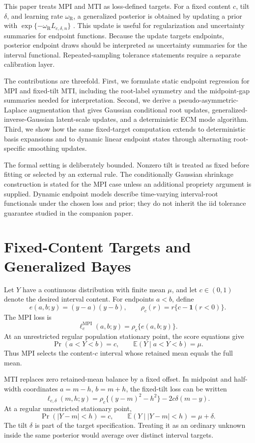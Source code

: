 \documentclass[11pt]{article}
\numberwithin{equation}{section}
\newcommand{\E}{\mathbb{E}}
\newcommand{\ind}{\mathbf{1}}
\begin{document}
This paper treats MPI and MTI as loss-defined targets. For a fixed content
\(c\), tilt \(\delta\), and learning rate \(\omega_{\mathrm R}\), a
generalized posterior is obtained by updating a prior with
\(\exp\{-\omega_{\mathrm R}L_{c,\delta,n}\}\)
\citep{BissiriHolmesWalker2016GeneralBayes}. This update is useful for
regularization and uncertainty summaries for endpoint functions. Because the
update targets endpoints, posterior endpoint draws should be interpreted as
uncertainty summaries for the interval functional. Repeated-sampling tolerance
statements require a separate calibration layer.

The contributions are threefold. First, we formulate static endpoint regression
for MPI and fixed-tilt MTI, including the root-label symmetry and the
midpoint-gap summaries needed for interpretation. Second, we derive a
pseudo-asymmetric-Laplace augmentation that gives Gaussian conditional root
updates, generalized-inverse-Gaussian latent-scale updates, and a deterministic
ECM mode algorithm. Third, we show how the same fixed-target computation extends
to deterministic basis expansions and to dynamic linear endpoint states through
alternating root-specific smoothing updates.

The formal setting is deliberately bounded. Nonzero tilt is treated as fixed before
fitting or selected by an external rule. The conditionally Gaussian shrinkage
construction is stated for the MPI case unless an additional propriety argument
is supplied. Dynamic endpoint models describe time-varying interval-root
functionals under the chosen loss and prior; they do not inherit the iid
tolerance guarantee studied in the companion paper.

\section{Fixed-Content Targets and Generalized Bayes}
\label{sec:targets}

Let \(Y\) have a continuous distribution with finite mean \(\mu\), and let
\(c\in(0,1)\) denote the desired interval content. For endpoints \(a<b\), define
\[
e(a,b;y)=(y-a)(y-b),
\qquad
\rho_c(r)=r\{c-\ind(r<0)\}.
\]
The MPI loss is
\[
\ell_c^{\mathrm{MPI}}(a,b;y)=\rho_c\{e(a,b;y)\}.
\]
At an unrestricted regular population stationary point, the score equations
give
\[
\Pr(a<Y<b)=c,
\qquad
\E(Y\mid a<Y<b)=\mu.
\]
Thus MPI selects the content-\(c\) interval whose retained mean equals the full
mean.

MTI replaces zero retained-mean balance by a fixed offset. In midpoint and
half-width coordinates \(a=m-h\), \(b=m+h\), the fixed-tilt loss can be written
\[
\ell_{c,\delta}(m,h;y)
=\rho_c\{(y-m)^2-h^2\}-2c\delta(m-y).
\]
At a regular unrestricted stationary point,
\[
\Pr(|Y-m|<h)=c,
\qquad
\E(Y\mid |Y-m|<h)=\mu+\delta .
\]
The tilt \(\delta\) is part of the target specification. Treating it as an
ordinary unknown inside the same posterior would average over distinct interval
targets.
\end{document}

